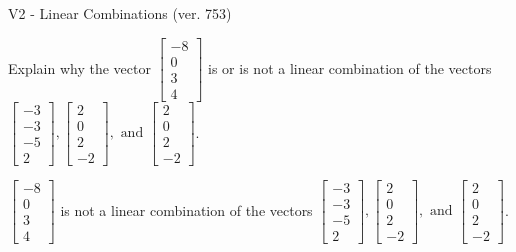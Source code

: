 \begin{exercise}
  \begin{exerciseTitle}V2 - Linear Combinations (ver. 753)\end{exerciseTitle}
  \begin{exerciseStatement}
    Explain why the vector \(\left[\begin{array}{c}
-8 \\
0 \\
3 \\
4
\end{array}\right]\)  is or is not a linear 
	combination of the vectors \(\left[\begin{array}{c}
-3 \\
-3 \\
-5 \\
2
\end{array}\right] , \left[\begin{array}{c}
2 \\
0 \\
2 \\
-2
\end{array}\right] , \text{ and } \left[\begin{array}{c}
2 \\
0 \\
2 \\
-2
\end{array}\right]\).
	


  \end{exerciseStatement}
  \begin{exerciseAnswer}
   \(\left[\begin{array}{c}
-8 \\
0 \\
3 \\
4
\end{array}\right]\) 
  	 is not  
	a linear combination of the vectors \(\left[\begin{array}{c}
-3 \\
-3 \\
-5 \\
2
\end{array}\right] , \left[\begin{array}{c}
2 \\
0 \\
2 \\
-2
\end{array}\right] , \text{ and } \left[\begin{array}{c}
2 \\
0 \\
2 \\
-2
\end{array}\right]\).

	
  


  \end{exerciseAnswer}
\end{exercise}